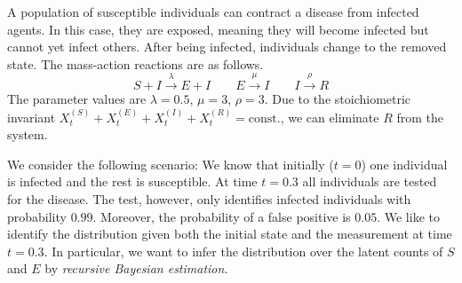 \begin{model}\label{model:seir}
A population of susceptible individuals can contract a disease from infected agents. In this case, they are exposed, meaning they will become infected but cannot yet infect others. After being infected, individuals change to the removed state. The mass-action reactions are as follows.
$$ S + I \xrightarrow{\lambda} E + I \qquad
E \xrightarrow{\mu} I \qquad
I \xrightarrow{\rho} R $$
The parameter values are $\lambda=0.5$, $\mu=3$, $\rho=3$. Due to the stoichiometric invariant $X_t^{(S)} + X_t^{(E)} + X_t^{(I)} + X_t^{(R)} = \mathrm{const.}$, we can eliminate $R$ from the system.
\end{model}

We consider the following scenario:
We know that initially ($t=0$) one individual is infected and the rest is susceptible.
At time $t=0.3$ all individuals are tested for the disease.
The test, however, only identifies infected individuals with probability $0.99$.
Moreover, the probability of a false positive is $0.05$.
We like to identify the distribution given both the initial state and the measurement at time $t=0.3$.
In particular, we want to infer the distribution over the latent counts of  $S$ and $E$ by
  \emph{recursive Bayesian estimation}.

